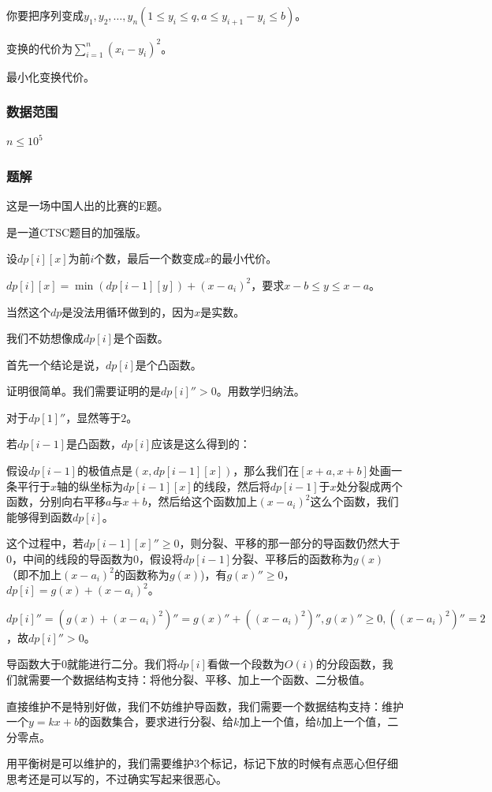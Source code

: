 \documentclass{ctexart}
\begin{document}
你要把序列变成$y_1,y_2,\ldots,y_n(1 \le y_i \le q,a \le y_{i+1}-y_i \le b)$。

变换的代价为$\sum\limits_{i=1}^n (x_i-y_i)^2$。

最小化变换代价。
\subsubsection{数据范围}
$n \le 10^5$
\subsubsection{题解}
这是一场中国人出的比赛的E题。

是一道CTSC题目的加强版。

设$dp[i][x]$为前$i$个数，最后一个数变成$x$的最小代价。

$dp[i][x]=\min(dp[i-1][y])+(x-a_i)^2$，要求$x-b \le y \le x-a$。

当然这个$dp$是没法用循环做到的，因为$x$是实数。

我们不妨想像成$dp[i]$是个函数。

首先一个结论是说，$dp[i]$是个凸函数。

证明很简单。我们需要证明的是$dp[i]''>0$。用数学归纳法。

对于$dp[1]''$，显然等于$2$。

若$dp[i-1]$是凸函数，$dp[i]$应该是这么得到的：

假设$dp[i-1]$的极值点是$(x,dp[i-1][x])$，那么我们在$[x+a,x+b]$处画一条平行于$x$轴的纵坐标为$dp[i-1][x]$的线段，然后将$dp[i-1]$于$x$处分裂成两个函数，分别向右平移$a$与$x+b$，然后给这个函数加上$(x-a_i)^2$这么个函数，我们能够得到函数$dp[i]$。

这个过程中，若$dp[i-1][x]'' \ge 0$，则分裂、平移的那一部分的导函数仍然大于$0$，中间的线段的导函数为$0$，假设将$dp[i-1]$分裂、平移后的函数称为$g(x)$（即不加上$(x-a_i)^2$的函数称为$g(x)$)，有$g(x)'' \ge 0$，$dp[i]=g(x)+(x-a_i)^2$。

$dp[i]''=(g(x)+(x-a_i)^2)''=g(x)''+((x-a_i)^2)'',g(x)'' \ge 0,((x-a_i)^2)''=2$，故$dp[i]''>0$。

导函数大于$0$就能进行二分。我们将$dp[i]$看做一个段数为$O(i)$的分段函数，我们就需要一个数据结构支持：将他分裂、平移、加上一个函数、二分极值。

直接维护不是特别好做，我们不妨维护导函数，我们需要一个数据结构支持：维护一个$y=kx+b$的函数集合，要求进行分裂、给$k$加上一个值，给$b$加上一个值，二分零点。

用平衡树是可以维护的，我们需要维护$3$个标记，标记下放的时候有点恶心但仔细思考还是可以写的，不过确实写起来很恶心。
\end{document}
